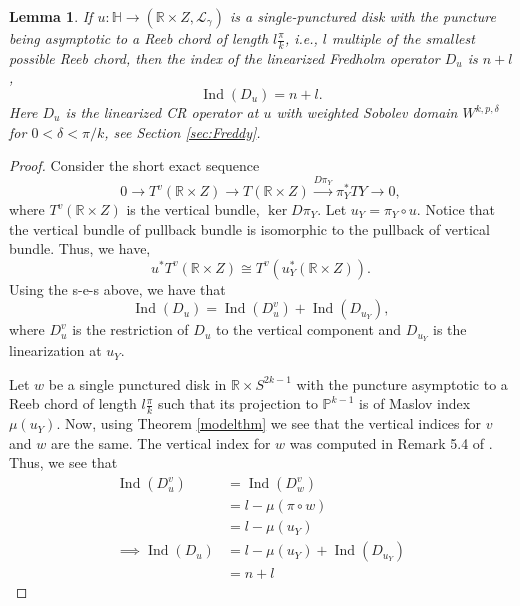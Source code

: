 \documentclass[11pt, oneside,dvipsnames]{amsart}
\newcommand{\of}{\circ}
\renewcommand{\to}{\rightarrow}
\renewcommand{\to}{\rightarrow}
\newcommand{\<}{\langle}
\renewcommand{\>}{\rangle}
\DeclareMathOperator{\Ind}{Ind}
\newcommand{\bH}{\mathbb{H}}
\newcommand{\bP}{\mathbb{P}}
\newcommand{\bR}{\mathbb{R}}
\newcommand{\cL}{\mathcal{L}}
\renewcommand{\to}{\rightarrow}
\newtheorem{lemma}[Theorem]{Lemma}
\theoremstyle{definition}
\theoremstyle{definition}
\numberwithin{equation}{subsection}
\begin{document}
\begin{lemma}\label{lemm:singlepuncindex}
    If $u:\bH \to (\bR \times Z, \cL_\gamma) $ is a single-punctured disk with the puncture being asymptotic to a Reeb chord of length $l \frac{\pi}{k}$, i.e., $l$ multiple of the smallest possible Reeb chord, then the index of the linearized Fredholm operator $D_u$ is $n+l$, $$\Ind(D_u) = n + l.$$
    Here $D_u$ is the linearized CR operator at $u$ with weighted Sobolev domain $W^{k,p,\delta}$ for $0 < \delta < \pi/k$, see Section \ref{sec:Freddy}.
\end{lemma}

\begin{proof}
    Consider the short exact sequence 
    $$ 0 \to T^v (\bR \times Z) \to T(\bR \times Z) \xrightarrow{D\pi_Y} \pi_Y^* TY \to 0, $$ where $T^v (\bR \times Z)$ is the vertical bundle, $\ker D\pi_Y$. Let $u_Y = \pi_Y \of u.$ Notice that the vertical bundle of pullback bundle is isomorphic to the pullback of vertical bundle. Thus, we have, $$u^* T^v(\bR \times Z) \cong T^v (u_Y^* (\bR \times Z)).$$
    Using the s-e-s above, we have that $$\Ind (D_u) = \Ind (D^v_u) + \Ind (D_{u_Y}),$$ where $D^v_u$ is the restriction of $D_u$ to the vertical component and $D_{u_Y}$ is the linearization at $u_Y$. 
    
    Let $w$ be a single punctured disk in $\bR \times S^{2k-1}$ with the puncture asymptotic to a Reeb chord of length $l\frac{\pi}{k}$ such that its projection to $\bP^{k-1}$ is of Maslov index $\mu(u_Y)$. Now, using Theorem \ref{modelthm} we see that the vertical indices for $v$ and $w$ are the same. The vertical index for $w$ was computed in Remark 5.4 of \cite{Cha23}. Thus, we see that 
    \begin{align*}
        \Ind (D^v_u)  &=  \Ind (D^v_w) \\ &= l - \mu(\pi \of w)  \\&= l - \mu(u_Y) \\
        \implies \Ind (D_u) &= l - \mu(u_Y) + \Ind (D_{u_Y})\\
        &= n + l
    \end{align*}
\end{proof}
\end{document}
